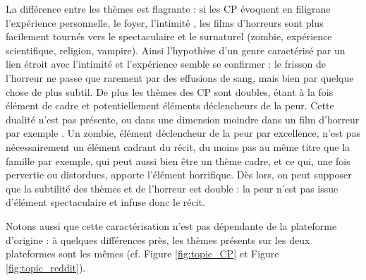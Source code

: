 \documentclass[12pt,a4paper,oneside,titlepage]{book} %
\begin{document}
	La différence entre les thèmes est flagrante : si les CP évoquent en filigrane l'expérience personnelle, le foyer, l'intimité , les films d'horreurs sont plus facilement tournés vers le spectaculaire et le surnaturel (zombie, expérience scientifique, religion, vampire). 
	Ainsi l'hypothèse d'un genre caractérisé par un lien étroit avec l'intimité et l'expérience semble se confirmer : le frisson de l'horreur ne passe que rarement par des effusions de sang, mais bien par quelque chose de plus subtil.
	De plus les thèmes des CP sont doubles, étant à la fois élément de cadre et potentiellement éléments déclencheurs de la peur. Cette dualité n'est pas présente, ou dans une dimension moindre dans un film d'horreur par exemple . Un zombie, élément déclencheur de la peur par excellence, n'est pas nécessairement un élément cadrant du récit, du moins pas au même titre que la famille par exemple, qui peut aussi bien être un thème cadre, et ce qui, une fois pervertie ou distordues, apporte l'élément horrifique. Dès lors, on peut supposer que la subtilité des thèmes et de l'horreur est double : la peur n'est pas issue d'élément spectaculaire et infuse donc le récit.
	
	
	Notons aussi que cette caractérisation n'est pas dépendante de la plateforme d'origine : à quelques différences près, les thèmes présents sur les deux plateformes sont les mêmes (cf. Figure \ref{fig:topic_CP} et Figure \ref{fig:topic_reddit}). 
	
		
		
\end{document}
